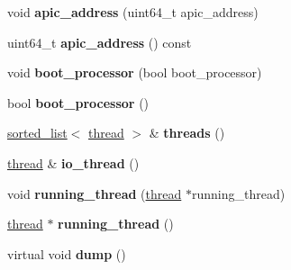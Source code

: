 \begin{DoxyCompactItemize}
void {\bfseries apic\+\_\+address} (uint64\+\_\+t apic\+\_\+address)
\item 
\hypertarget{classprocessor__base_a7a18d5ab30ca6b262a4e97199f559650}{}\label{classprocessor__base_a7a18d5ab30ca6b262a4e97199f559650} 
uint64\+\_\+t {\bfseries apic\+\_\+address} () const
\item 
\hypertarget{classprocessor__base_a7804c678898d2070c1aff039e531f2ee}{}\label{classprocessor__base_a7804c678898d2070c1aff039e531f2ee} 
void {\bfseries boot\+\_\+processor} (bool boot\+\_\+processor)
\item 
\hypertarget{classprocessor__base_ad06fe0fea02e95026ef5990f9b7e7225}{}\label{classprocessor__base_ad06fe0fea02e95026ef5990f9b7e7225} 
bool {\bfseries boot\+\_\+processor} ()
\item 
\hypertarget{classprocessor__base_a07fac7030fb43f4204c71ef6148c5716}{}\label{classprocessor__base_a07fac7030fb43f4204c71ef6148c5716} 
\hyperlink{classsorted__list}{sorted\+\_\+list}$<$ \hyperlink{classthread}{thread} $>$ \& {\bfseries threads} ()
\item 
\hypertarget{classprocessor__base_ae519ab5ed729eb6388417676f81a5cc4}{}\label{classprocessor__base_ae519ab5ed729eb6388417676f81a5cc4} 
\hyperlink{classthread}{thread} \& {\bfseries io\+\_\+thread} ()
\item 
\hypertarget{classprocessor__base_a077987899bafaebc0e5905941f2eeaad}{}\label{classprocessor__base_a077987899bafaebc0e5905941f2eeaad} 
void {\bfseries running\+\_\+thread} (\hyperlink{classthread}{thread} $\ast$running\+\_\+thread)
\item 
\hypertarget{classprocessor__base_a7cf10dce7e5bd4669314602aa830eb2e}{}\label{classprocessor__base_a7cf10dce7e5bd4669314602aa830eb2e} 
\hyperlink{classthread}{thread} $\ast$ {\bfseries running\+\_\+thread} ()
\item 
\hypertarget{classprocessor__base_a6291e61d54d216dc562aaddde308b3a0}{}\label{classprocessor__base_a6291e61d54d216dc562aaddde308b3a0} 
virtual void {\bfseries dump} ()
\end{DoxyCompactItemize}
